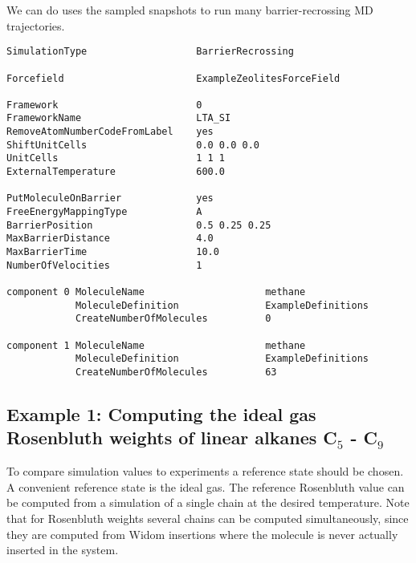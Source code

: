 We can do uses the sampled snapshots to run many barrier-recrossing MD trajectories.
\begin{small}
\begin{verbatim}
SimulationType                   BarrierRecrossing

Forcefield                       ExampleZeolitesForceField

Framework                        0
FrameworkName                    LTA_SI
RemoveAtomNumberCodeFromLabel    yes
ShiftUnitCells                   0.0 0.0 0.0
UnitCells                        1 1 1
ExternalTemperature              600.0

PutMoleculeOnBarrier             yes
FreeEnergyMappingType            A
BarrierPosition                  0.5 0.25 0.25
MaxBarrierDistance               4.0
MaxBarrierTime                   10.0
NumberOfVelocities               1

component 0 MoleculeName                     methane
            MoleculeDefinition               ExampleDefinitions
            CreateNumberOfMolecules          0

component 1 MoleculeName                     methane
            MoleculeDefinition               ExampleDefinitions
            CreateNumberOfMolecules          63
\end{verbatim}
\end{small}


\subsection*{Example 1: Computing the ideal gas Rosenbluth weights of linear alkanes C$_5$ - C$_9$}

To compare simulation values to experiments a reference state should be chosen. A convenient reference state
is the ideal gas. The reference Rosenbluth value can be computed from a simulation of a single chain at the
desired temperature. Note that for Rosenbluth weights several chains can be computed simultaneously, since
they are computed from Widom insertions where the molecule is never actually inserted in the system.

